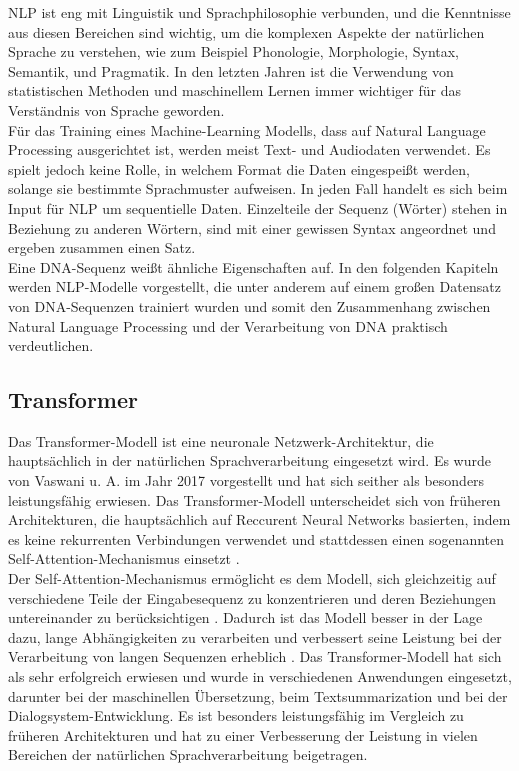\documentclass[oneside,bibliography=totocnumbered,BCOR=5mm]{scrbook}%
\theoremstyle{definition}
\theoremstyle{definition}
\theoremstyle{definition}
\theoremstyle{definition}
\theoremstyle{definition}
\theoremstyle{definition}
\begin{document}
NLP ist eng mit Linguistik und Sprachphilosophie verbunden, 
und die Kenntnisse aus diesen Bereichen sind wichtig, um die komplexen Aspekte der natürlichen Sprache zu verstehen, 
wie zum Beispiel Phonologie, Morphologie, Syntax, Semantik, und Pragmatik.
In den letzten Jahren ist die Verwendung von statistischen Methoden und 
maschinellem Lernen immer wichtiger für das Verständnis von Sprache geworden.\\


Für das Training eines Machine-Learning Modells, dass auf Natural Language Processing 
ausgerichtet ist, werden meist Text- und Audiodaten verwendet. 
Es spielt jedoch keine Rolle, in welchem Format die Daten eingespeißt werden, 
solange sie bestimmte Sprachmuster aufweisen. In jeden Fall handelt es sich beim Input für NLP um sequentielle Daten. 
Einzelteile der Sequenz (Wörter) stehen in Beziehung zu anderen Wörtern, 
sind mit einer gewissen Syntax angeordnet und ergeben zusammen einen Satz. \\


Eine DNA-Sequenz weißt ähnliche Eigenschaften auf. In den folgenden Kapiteln werden 
NLP-Modelle vorgestellt, die unter anderem auf einem großen Datensatz von DNA-Sequenzen 
trainiert wurden und somit den Zusammenhang zwischen Natural Language Processing und der
Verarbeitung von DNA praktisch verdeutlichen. \\
\linebreak[4]


\subsection{Transformer}


Das Transformer-Modell ist eine neuronale Netzwerk-Architektur, 
die hauptsächlich in der natürlichen Sprachverarbeitung eingesetzt wird. 
Es wurde von Vaswani u. A. \autocite{transformer} im Jahr 2017 vorgestellt und 
hat sich seither als besonders leistungsfähig erwiesen. 
Das Transformer-Modell unterscheidet sich von früheren Architekturen, 
die hauptsächlich auf Reccurent Neural Networks basierten, 
indem es keine rekurrenten Verbindungen verwendet und stattdessen einen sogenannten 
Self-Attention-Mechanismus einsetzt \autocite[Seite 1]{transformer}. \\


Der Self-Attention-Mechanismus ermöglicht es dem Modell, sich gleichzeitig auf verschiedene 
Teile der Eingabesequenz zu konzentrieren und deren Beziehungen untereinander zu 
berücksichtigen \autocite[Seite 1]{transformer}. 
Dadurch ist das Modell besser in der Lage dazu, lange Abhängigkeiten zu verarbeiten und 
verbessert seine Leistung bei der Verarbeitung von langen Sequenzen erheblich \autocite[Seite 1]{transformer}. 
Das Transformer-Modell hat sich als sehr erfolgreich erwiesen und wurde in verschiedenen Anwendungen eingesetzt, 
darunter bei der maschinellen Übersetzung, beim Textsummarization und bei der Dialogsystem-Entwicklung. 
Es ist besonders leistungsfähig im Vergleich zu früheren Architekturen und hat zu einer Verbesserung der Leistung 
in vielen Bereichen der natürlichen Sprachverarbeitung beigetragen. \\
\end{document}

